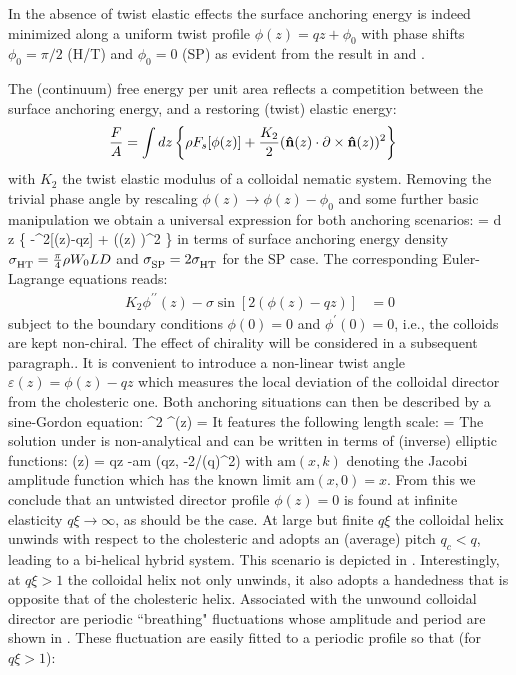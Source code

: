 In the absence of twist elastic effects the surface anchoring energy is indeed minimized along a uniform twist profile $\phi(z) = qz + \phi_{0} $ with phase shifts $\phi_{0} = \pi/2$ (H/T) and $\phi_{0} = 0$ (SP) as evident from the result in  and .


The (continuum) free energy per unit area reflects a competition between the surface anchoring energy, and a restoring (twist) elastic energy:
\begin{align}
\frac{F}{A} &= \int d z \left \{ \rho F_{s}[\phi(z)]  + \frac{K_{2}}{2} ({\bf \hat{n}}(z) \cdot \partial \times {\bf \hat{n}}(z) )^{2} \right \}
\end{align}
with $K_{2}$ the twist elastic modulus of a colloidal nematic system.
Removing the trivial phase angle by rescaling $\phi(z) \rightarrow \phi(z) - \phi_{0}$ and some further basic manipulation we obtain a universal expression for both anchoring scenarios:
\beq
{} = \int d z \left \{ -\sigma \cos^{2}[\phi(z)-qz] +  (\partial \phi(z)  )^{2} \right \}
\label{freedens}
\eeq
in terms of surface anchoring energy density $\sigma_{\ds \rm HT} = \tfrac{\pi}{4} \rho W_{0}LD$ and $\sigma_{\ds \rm SP} = 2 \sigma_{\ds \rm HT}$ for the SP case. The corresponding Euler-Lagrange equations reads:
\begin{align}
 K_{2}\phi^{\prime \prime}(z) - \sigma \sin[2 ( \phi(z)- qz)]&=0
 \label{nlde}
 \end{align}
subject to the boundary conditions $\phi(0) = 0$ and $\phi^{\prime}(0) = 0$, i.e., the colloids are kept non-chiral. The effect of chirality will be considered in a subsequent paragraph..
It is convenient to introduce a non-linear twist angle $\varepsilon(z) = \phi(z) - qz$ which measures the local deviation of the colloidal director from the cholesteric one. Both anchoring situations can then be described by a sine-Gordon equation:
\beq
 \xi^{2} \varepsilon^{\prime \prime}(z) = \sin[2\varepsilon(z) ]
\label{diffeps}
\eeq
It features the following length scale:
\beq
\xi = 
\eeq
The  solution under is non-analytical and can be written in terms of (inverse) elliptic functions:
\beq
\phi(z) = qz -\textrm{am} (qz, -2/(q\xi)^{2})
\label{jaf}
\eeq
with $\textrm{am}(x,k)$ denoting the Jacobi amplitude function which has the known limit $ \textrm{am}(x,0) = x$. From this we conclude that an untwisted director profile $\phi(z) = 0$ is found at infinite elasticity $q\xi \rightarrow \infty$, as should be the case. At large but finite $q\xi$ the colloidal helix unwinds with respect to the cholesteric and adopts an (average) pitch $q_{c} <q$, leading to a bi-helical hybrid system. This scenario is depicted in . Interestingly, at $q\xi >1$ the colloidal helix not only unwinds, it also adopts a handedness that is opposite that of the cholesteric helix.  Associated with the unwound colloidal director are periodic ``breathing" fluctuations whose amplitude and period are shown in .  These fluctuation are easily fitted to a periodic profile so that (for $q \xi >1$):

